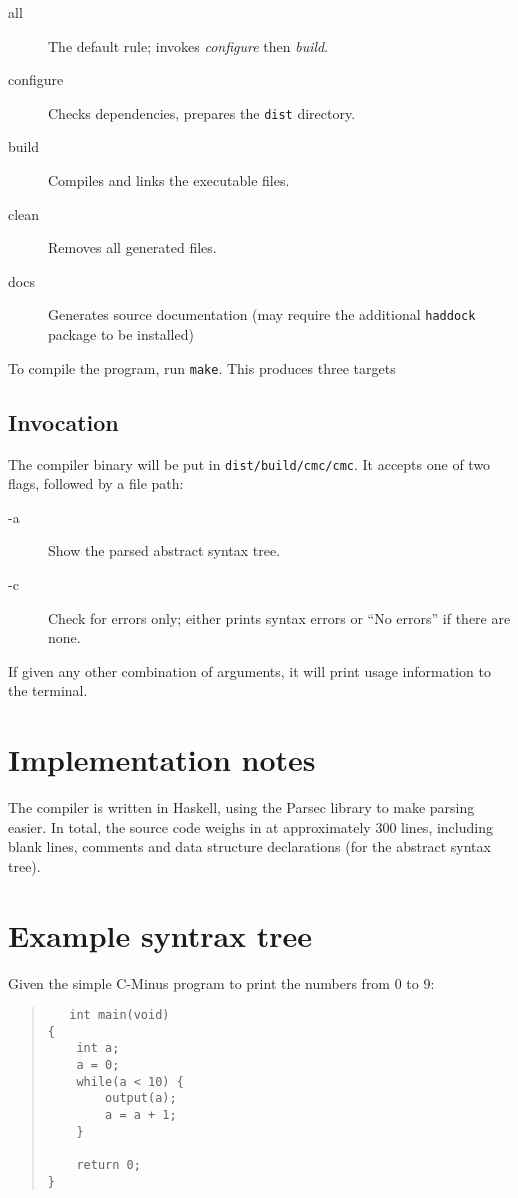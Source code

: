 \documentclass[12pt]{amsart}
\begin{document}
\begin{description}
\item[all] The default rule; invokes \emph{configure} then
  \emph{build}. 
\item[configure] Checks dependencies, prepares the \verb|dist| directory.
\item[build] Compiles and links the executable files.
\item[clean] Removes all generated files.
\item[docs] Generates source documentation (may require the additional
  \verb|haddock| package to be installed)
\end{description}

To compile the program, run \verb|make|. This produces three targets

\subsection{Invocation}
The compiler binary will be put in \verb|dist/build/cmc/cmc|. It
accepts one of two flags, followed by a file path:

\begin{description}
\item[-a] Show the parsed abstract syntax tree.
\item[-c] Check for errors only; either prints syntax errors or ``No
  errors'' if there are none.
\end{description}

If given any other combination of arguments, it will print usage
information to the terminal.


\section{Implementation notes}
\label{implementation}

The compiler is written in Haskell, using the Parsec library to make
parsing easier. In total, the source code weighs in at approximately
300 lines, including blank lines, comments and data structure
declarations (for the abstract syntax tree).




\section{Example syntrax tree}
Given the simple C-Minus program to print the numbers from 0 to 9:

\begin{verse}
\begin{verbatim}
   int main(void)
{
    int a;
    a = 0;
    while(a < 10) {
        output(a);
        a = a + 1;
    }

    return 0;
}
\end{verbatim}
\end{verse}
\end{document}

